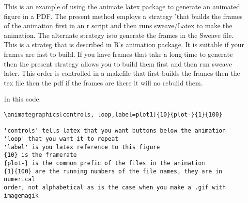 \documentclass{article}
\begin{document}
This is an example of using the animate latex package to generate
an animated figure in a PDF. The present method employs a strategy
'that builds the frames of the animation first in an r script and
then runs sweave/Latex to make the animation. The alternate strategy
isto generate the frames in the Sweave file. This is a strateg that
is described in R's animation package. It is suitable if your frames
are fast to build. If you have frames that take a long time to
generate then the present strategy allows you to build them first
and then run sweave later. This order is controlled in a makefile
that first builds the frames then the tex file then the pdf if the
frames are there it will
no rebuild them.

In this code:
\begin{verbatim}
\animategraphics[controls, loop,label=plot1]{10}{plot-}{1}{100}

'controls' tells latex that you want buttons below the animation
'loop' that you want it to repeat
'label' is you latex reference to this figure
{10} is the framerate
{plot-} is the common prefic of the files in the animation
{1}{100} are the running numbers of the file names, they are in numerical
order, not alphabetical as is the case when you make a .gif with imagemagik
\end{verbatim}


\end{document}
